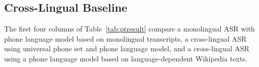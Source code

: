 \subsection{Cross-Lingual Baseline}
\label{s6:mlbaseline}

The first four columns of Table~\ref{tab:ptresult}
compare a monolingual ASR with phone language model based on
monolingual transcripts, a 
cross-lingual ASR using universal phone set and
phone language model, and a cross-lingual ASR using a
phone language model based on language-dependent Wikipedia texts.

%

